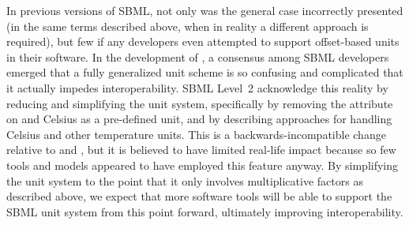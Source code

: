 In previous versions of SBML, not only was the general case
incorrectly presented (\ie in the same terms described above, when
in reality a different approach is required), but few if any
developers even attempted to support offset-based units in their
software.  In the development of \sbmltwotwo, a consensus among
SBML developers emerged that a fully generalized unit scheme
is so confusing and complicated that it actually impedes
interoperability.  SBML Level~2  acknowledge this reality by reducing
and simplifying the unit system, specifically by removing the
 attribute on \Unit and Celsius as a pre-defined unit,
and by describing approaches for handling Celsius and other
temperature units.  This is a backwards-incompatible change
relative to \sbmltwoone and \sbmlonetwo, but it is believed to
have limited real-life impact because so few tools and models
appeared to have employed this feature anyway.  By simplifying the
unit system to the point that it only involves multiplicative
factors as described above, we expect that more software tools
will be able to support the SBML unit system from this point
forward, ultimately improving interoperability.


